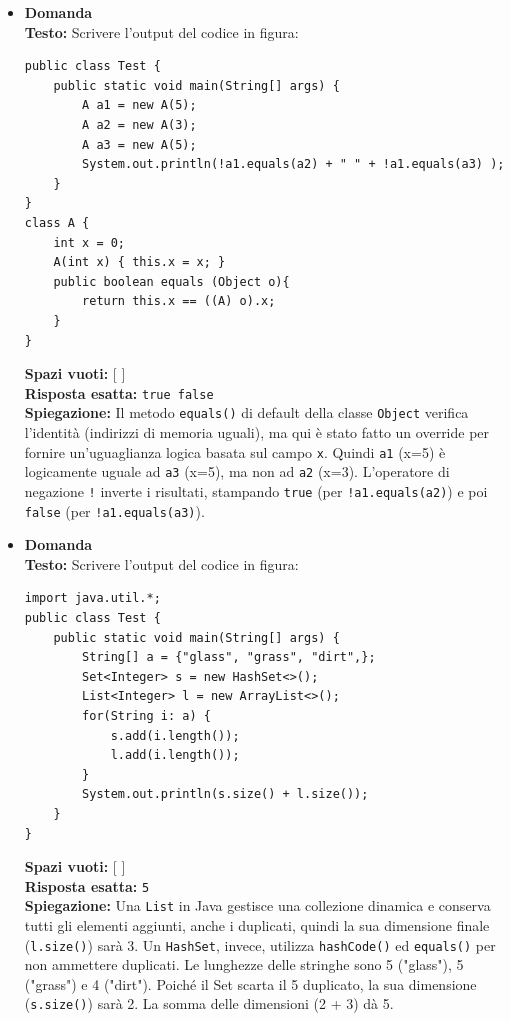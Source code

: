 \documentclass[12pt, a4paper]{article}
\begin{document}
\begin{itemize}
    \item {}\textbf{Domanda \thedomanda} \\
    \textbf{Testo:} Scrivere l'output del codice in figura:
\begin{verbatim}
public class Test {
    public static void main(String[] args) {
        A a1 = new A(5);
        A a2 = new A(3);
        A a3 = new A(5);
        System.out.println(!a1.equals(a2) + " " + !a1.equals(a3) );
    }
}
class A {
    int x = 0;
    A(int x) { this.x = x; }
    public boolean equals (Object o){
        return this.x == ((A) o).x;
    }
}
\end{verbatim}
    \textbf{Spazi vuoti:} [ \hspace{2cm} ] \\
    \textbf{Risposta esatta:} \texttt{true false} \\
    \textbf{Spiegazione:} Il metodo \texttt{equals()} di default della classe \texttt{Object} verifica l'identità (indirizzi di memoria uguali), ma qui è stato fatto un override per fornire un'uguaglianza logica basata sul campo \texttt{x}. Quindi \texttt{a1} (x=5) è logicamente uguale ad \texttt{a3} (x=5), ma non ad \texttt{a2} (x=3). L'operatore di negazione \texttt{!} inverte i risultati, stampando \texttt{true} (per \texttt{!a1.equals(a2)}) e poi \texttt{false} (per \texttt{!a1.equals(a3)}).
    \vspace{0.5cm}

    \item {}\textbf{Domanda \thedomanda} \\
    \textbf{Testo:} Scrivere l'output del codice in figura:
\begin{verbatim}
import java.util.*;
public class Test {
    public static void main(String[] args) {
        String[] a = {"glass", "grass", "dirt",};
        Set<Integer> s = new HashSet<>();
        List<Integer> l = new ArrayList<>();
        for(String i: a) {
            s.add(i.length());
            l.add(i.length());
        }
        System.out.println(s.size() + l.size());
    }
}
\end{verbatim}
    \textbf{Spazi vuoti:} [ \hspace{2cm} ] \\
    \textbf{Risposta esatta:} \texttt{5} \\
    \textbf{Spiegazione:} Una \texttt{List} in Java gestisce una collezione dinamica e conserva tutti gli elementi aggiunti, anche i duplicati, quindi la sua dimensione finale (\texttt{l.size()}) sarà 3. Un \texttt{HashSet}, invece, utilizza \texttt{hashCode()} ed \texttt{equals()} per non ammettere duplicati. Le lunghezze delle stringhe sono 5 ("glass"), 5 ("grass") e 4 ("dirt"). Poiché il Set scarta il 5 duplicato, la sua dimensione (\texttt{s.size()}) sarà 2. La somma delle dimensioni (2 + 3) dà 5.
    \vspace{0.5cm}


\end{itemize}
\end{document}
